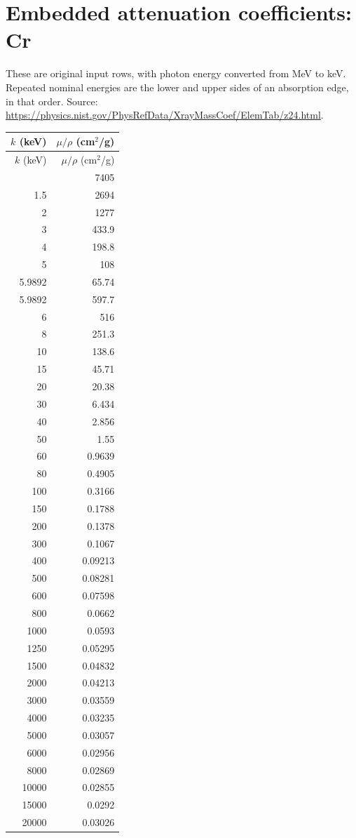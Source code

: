 \documentclass[10pt,a4paper]{article}
\begin{document}
\section{Embedded attenuation coefficients: Cr}
These are original input rows, with photon energy converted from MeV to keV. Repeated nominal energies are the lower and upper sides of an absorption edge, in that order. Source: \url{https://physics.nist.gov/PhysRefData/XrayMassCoef/ElemTab/z24.html}.
\small
\begin{longtable}{rr}
\toprule
$k$ (keV) & $\mu/\rho$ (cm$^2$/g) \\
\midrule
\endfirsthead
\toprule
$k$ (keV) & $\mu/\rho$ (cm$^2$/g) \\
\midrule
\endhead
\bottomrule
\endfoot
1 & 7405 \\
1.5 & 2694 \\
2 & 1277 \\
3 & 433.9 \\
4 & 198.8 \\
5 & 108 \\
5.9892 & 65.74 \\
5.9892 & 597.7 \\
6 & 516 \\
8 & 251.3 \\
10 & 138.6 \\
15 & 45.71 \\
20 & 20.38 \\
30 & 6.434 \\
40 & 2.856 \\
50 & 1.55 \\
60 & 0.9639 \\
80 & 0.4905 \\
100 & 0.3166 \\
150 & 0.1788 \\
200 & 0.1378 \\
300 & 0.1067 \\
400 & 0.09213 \\
500 & 0.08281 \\
600 & 0.07598 \\
800 & 0.0662 \\
1000 & 0.0593 \\
1250 & 0.05295 \\
1500 & 0.04832 \\
2000 & 0.04213 \\
3000 & 0.03559 \\
4000 & 0.03235 \\
5000 & 0.03057 \\
6000 & 0.02956 \\
8000 & 0.02869 \\
10000 & 0.02855 \\
15000 & 0.0292 \\
20000 & 0.03026 \\
\end{longtable}
\normalsize
\clearpage
\end{document}

